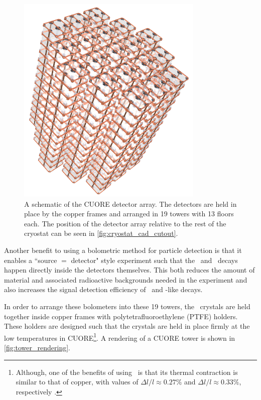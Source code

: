 \begin{figure}
    \centering
    \includegraphics[height=4in]{Figures/CUORE_detector_array_0.png}
    \caption[A schematic of the CUORE detector array]
    {A schematic of the CUORE detector array.
    The detectors are held in place by the copper frames and arranged in 19 towers with 13 floors each.
    The position of the detector array relative to the rest of the cryostat can be seen in \autoref{fig:cryostat_cad_cutout}.}
    \label{fig:cuore_detector_array}
\end{figure}

Another benefit to using a bolometric method for particle detection is that it enables a ``source $=$ detector" style experiment such that the \zeronubb~and \twonubb~decays happen directly inside the detectors themselves.
This both reduces the amount of material and associated radioactive backgrounds needed in the experiment and also increases the signal detection efficiency of \zeronubb~and \twonubb-like decays.

In order to arrange these bolometers into these 19 towers, the \teotwo~crystals are held together inside copper frames with polytetrafluoroethylene (PTFE) holders.
These holders are designed such that the crystals are held in place firmly at the low temperatures in CUORE\footnote{Although, one of the benefits of using \teotwo~is that its thermal contraction is similar to that of copper, with values of $\Delta l/l \approx 0.27\%$ and $\Delta l / l \approx 0.33\%$, respectively \cite{ALESSANDRELLO1995363}.}.
A rendering of a CUORE tower is shown in \autoref{fig:tower_rendering}.

